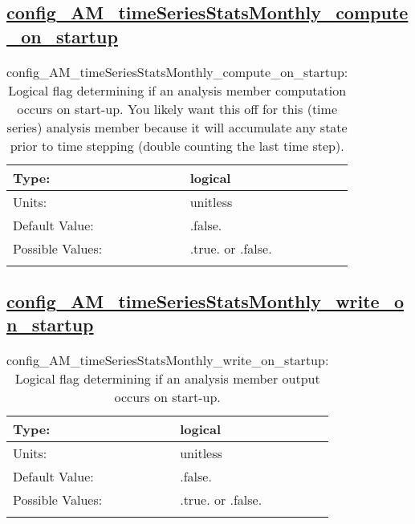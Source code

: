 \subsection[config\_AM\_timeSeriesStatsMonthly\_compute\_on\_startup]{\hyperref[sec:nm_tab_AM_timeSeriesStatsMonthly]{config\_AM\_timeSeriesStatsMonthly\_compute\_on\_startup}}
\label{subsec:nm_sec_config_AM_timeSeriesStatsMonthly_compute_on_startup}
\begin{center}
\begin{longtable}{| p{2.0in} || p{4.0in} |}
    \hline
    Type: & logical \\
    \hline
    Units: & \si{unitless} \\
    \hline
    Default Value: & .false. \\
    \hline
    Possible Values: & .true. or .false. \\
    \hline
    \caption{config\_AM\_timeSeriesStatsMonthly\_compute\_on\_startup: Logical flag determining if an analysis member computation occurs on start-up. You likely want this off for this (time series) analysis member because it will accumulate any state prior to time stepping (double counting the last time step).}
\end{longtable}
\end{center}
\subsection[config\_AM\_timeSeriesStatsMonthly\_write\_on\_startup]{\hyperref[sec:nm_tab_AM_timeSeriesStatsMonthly]{config\_AM\_timeSeriesStatsMonthly\_write\_on\_startup}}
\label{subsec:nm_sec_config_AM_timeSeriesStatsMonthly_write_on_startup}
\begin{center}
\begin{longtable}{| p{2.0in} || p{4.0in} |}
    \hline
    Type: & logical \\
    \hline
    Units: & \si{unitless} \\
    \hline
    Default Value: & .false. \\
    \hline
    Possible Values: & .true. or .false. \\
    \hline
    \caption{config\_AM\_timeSeriesStatsMonthly\_write\_on\_startup: Logical flag determining if an analysis member output occurs on start-up.}
\end{longtable}
\end{center}
